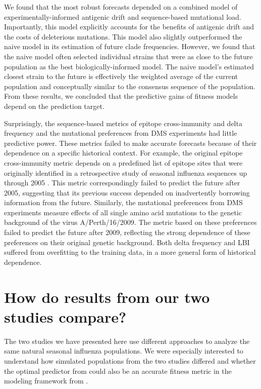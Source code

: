 We found that the most robust forecasts depended on a combined model of experimentally-informed antigenic drift and sequence-based mutational load.
Importantly, this model explicitly accounts for the benefits of antigenic drift and the costs of deleterious mutations.
This model also slightly outperformed the naive model in its estimation of future clade frequencies.
However, we found that the naive model often selected individual strains that were as close to the future population as the best biologically-informed model.
The naive model's estimated closest strain to the future is effectively the weighted average of the current population and conceptually similar to the consensus sequence of the population.
From these results, we concluded that the predictive gains of fitness models depend on the prediction target.

Surprisingly, the sequence-based metrics of epitope cross-immunity and delta frequency and the mutational preferences from DMS experiments had little predictive power.
These metrics failed to make accurate forecasts because of their dependence on a specific historical context.
For example, the original epitope cross-immunity metric \citep{Luksza:2014hj} depends on a predefined list of epitope sites that were originally identified in a retrospective study of seasonal influenza sequences up through 2005 \citep{Shih:2007bd}.
This metric correspondingly failed to predict the future after 2005, suggesting that its previous success depended on inadvertently borrowing information from the future.
Similarly, the mutational preferences from DMS experiments measure effects of all single amino acid mutations to the genetic background of the virus A/Perth/16/2009.
The metric based on these preferences failed to predict the future after 2009, reflecting the strong dependence of these preferences on their original genetic background.
Both delta frequency and LBI suffered from overfitting to the training data, in a more general form of historical dependence.

\section{How do results from our two studies compare?}

The two studies we have presented here use different approaches to analyze the same natural seasonal influenza populations.
We were especially interested to understand how simulated populations from the two studies differed and whether the optimal predictor from \citet{Barrat-Charlaix2020} could also be an accurate fitness metric in the modeling framework from \citet{Huddleston2020}.

